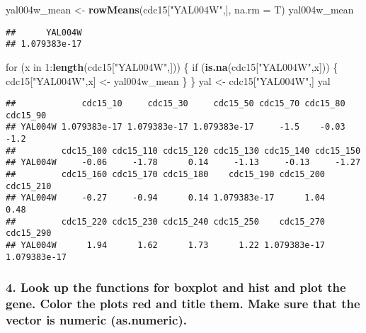 \documentclass[]{article}
\newenvironment{Shaded}{\begin{snugshade}}{\end{snugshade}}
\newcommand{\KeywordTok}[1]{\textcolor[rgb]{0.13,0.29,0.53}{\textbf{{#1}}}}
\newcommand{\DataTypeTok}[1]{\textcolor[rgb]{0.13,0.29,0.53}{{#1}}}
\newcommand{\DecValTok}[1]{\textcolor[rgb]{0.00,0.00,0.81}{{#1}}}
\newcommand{\StringTok}[1]{\textcolor[rgb]{0.31,0.60,0.02}{{#1}}}
\newcommand{\NormalTok}[1]{{#1}}
\begin{document}
\begin{Shaded}
\begin{Highlighting}[]
\NormalTok{yal004w_mean <-}\StringTok{ }\KeywordTok{rowMeans}\NormalTok{(cdc15[}\StringTok{"YAL004W"}\NormalTok{,], }\DataTypeTok{na.rm =} \NormalTok{T)}
\NormalTok{yal004w_mean}
\end{Highlighting}
\end{Shaded}

\begin{verbatim}
##      YAL004W 
## 1.079383e-17
\end{verbatim}

\begin{Shaded}
\begin{Highlighting}[]
\NormalTok{for (x in }\DecValTok{1}\NormalTok{:}\KeywordTok{length}\NormalTok{(cdc15[}\StringTok{"YAL004W"}\NormalTok{,])) \{}
    \NormalTok{if (}\KeywordTok{is.na}\NormalTok{(cdc15[}\StringTok{"YAL004W"}\NormalTok{,x])) \{}
        \NormalTok{cdc15[}\StringTok{"YAL004W"}\NormalTok{,x] <-}\StringTok{ }\NormalTok{yal004w_mean}
    \NormalTok{\}}
\NormalTok{\}}
\NormalTok{yal <-}\StringTok{ }\NormalTok{cdc15[}\StringTok{"YAL004W"}\NormalTok{,]}
\NormalTok{yal}
\end{Highlighting}
\end{Shaded}

\begin{verbatim}
##             cdc15_10     cdc15_30     cdc15_50 cdc15_70 cdc15_80 cdc15_90
## YAL004W 1.079383e-17 1.079383e-17 1.079383e-17     -1.5    -0.03     -1.2
##         cdc15_100 cdc15_110 cdc15_120 cdc15_130 cdc15_140 cdc15_150
## YAL004W     -0.06     -1.78      0.14     -1.13     -0.13     -1.27
##         cdc15_160 cdc15_170 cdc15_180    cdc15_190 cdc15_200 cdc15_210
## YAL004W     -0.27     -0.94      0.14 1.079383e-17      1.04      0.48
##         cdc15_220 cdc15_230 cdc15_240 cdc15_250    cdc15_270    cdc15_290
## YAL004W      1.94      1.62      1.73      1.22 1.079383e-17 1.079383e-17
\end{verbatim}

\newpage

\subsubsection{4. Look up the functions for boxplot and hist and plot
the gene. Color the plots red and title them. Make sure that the vector
is numeric
(as.numeric).}\label{look-up-the-functions-for-boxplot-and-hist-and-plot-the-gene.-color-the-plots-red-and-title-them.-make-sure-that-the-vector-is-numeric-as.numeric.}
\end{document}

